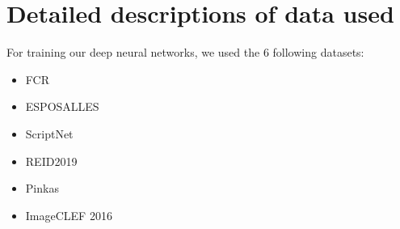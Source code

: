 \documentclass{polytech/polytech}
\numberwithin{figure}{chapter}
\begin{document}
\begin{appendix}
\label{dataPrep}

\section{Detailed descriptions of data used}

For training our deep neural networks, we used the 6 following datasets:
\begin{itemize}
\item FCR
\item ESPOSALLES
\item ScriptNet
\item REID2019
\item Pinkas
\item ImageCLEF 2016
\end{itemize}


\end{appendix}
\end{document}
